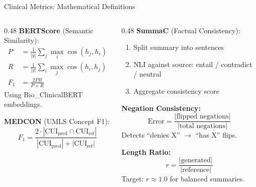\documentclass[10pt, aspectratio=169]{beamer}
\begin{document}
\begin{frame}{Clinical Metrics: Mathematical Definitions}
  \small
  \begin{columns}[T]
    \begin{column}{0.48\textwidth}
      \textbf{BERTScore} (Semantic Similarity):
      \vspace{-0.15cm}
      \begin{align}
        P &= \frac{1}{|\hat{y}|}\sum_j \max_i \cos(h_j, h_i) \nonumber \\
        R &= \frac{1}{|y|}\sum_i \max_j \cos(h_i, h_j) \nonumber \\
        F_1 &= \frac{2PR}{P+R} \nonumber
      \end{align}
      \vspace{-0.3cm}
      {\scriptsize Using Bio\_ClinicalBERT embeddings.}

      \vspace{0.1cm}
      \textbf{MEDCON} (UMLS Concept F1):
      \vspace{-0.1cm}
      \begin{equation}
        F_1 = \frac{2 \cdot |\text{CUI}_{\text{pred}} \cap \text{CUI}_{\text{ref}}|}{|\text{CUI}_{\text{pred}}| + |\text{CUI}_{\text{ref}}|} \nonumber
      \end{equation}
    \end{column}
    \begin{column}{0.48\textwidth}
      \textbf{SummaC} (Factual Consistency):
      \begin{enumerate}\setlength{\itemsep}{0pt}
        \item Split summary into sentences
        \item NLI against source: entail / contradict / neutral
        \item Aggregate consistency score
      \end{enumerate}

      \vspace{0.1cm}
      \textbf{Negation Consistency:}
      \vspace{-0.1cm}
      \begin{equation}
        \text{Error} = \frac{|\text{flipped negations}|}{|\text{total negations}|} \nonumber
      \end{equation}
      \vspace{-0.2cm}
      {\scriptsize Detects ``denies X'' $\rightarrow$ ``has X'' flips.}

      \vspace{0.1cm}
      \textbf{Length Ratio:}
      \vspace{-0.1cm}
      \begin{equation}
        r = \frac{|\text{generated}|}{|\text{reference}|} \nonumber
      \end{equation}
      \vspace{-0.2cm}
      {\scriptsize Target: $r \approx 1.0$ for balanced summaries.}
    \end{column}
  \end{columns}
\end{frame}
\end{document}
